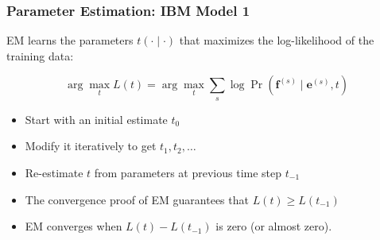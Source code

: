 \begin{frame}
\frametitle{Parameter Estimation: IBM Model 1}
\begin{block}{}
EM learns the parameters $t(\cdot \mid \cdot)$ that maximizes
the log-likelihood of the training data:

\[ \arg\max_{t} L(t) = \arg\max_{t} \sum_s \log \Pr(\mathbf{f}^{(s)} \mid
\mathbf{e}^{(s)}, t) \]
\end{block}\pause

\begin{block}{}
\begin{itemize}[<+->]
\item Start with an initial estimate $t_0$
\item Modify it iteratively to get $t_1, t_2, \ldots$
\item Re-estimate $t$ from parameters at previous time step $t_{-1}$
\item The convergence proof of EM guarantees that $L(t) \geq L(t_{-1})$
\item EM converges when $L(t) - L(t_{-1})$ is zero (or almost zero).
\end{itemize}

\end{block}
\end{frame}




